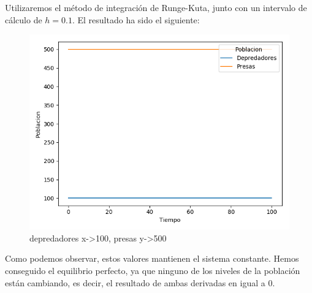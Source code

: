 \documentclass[11pt,a4paper]{article}
\begin{document}
Utilizaremos el método de integración de Runge-Kuta, junto con un intervalo de cálculo de $h=0.1$. El resultado ha sido el siguiente:
\begin{figure}[H]
	\centering
	\includegraphics[scale=0.65]{img/2-100-500.png}
	\caption{depredadores x->100,   presas y->500}
\end{figure}

Como podemos observar, estos valores mantienen el sistema constante. Hemos conseguido el equilibrio perfecto, ya que ninguno de los niveles
de la población están cambiando, es decir, el resultado de ambas derivadas en igual a 0.
\end{document}

